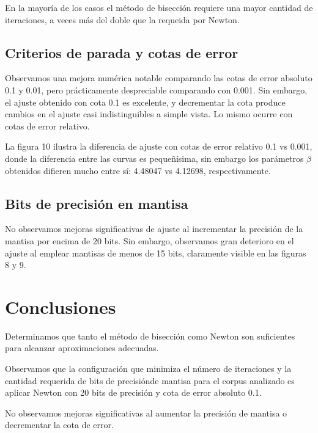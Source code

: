 \documentclass[a4paper,10pt,twoside]{article}
\begin{document}
En la mayoría de los casos el método de bisección requiere una mayor cantidad
de iteraciones, a veces más del doble que la requeida por Newton.


\subsection{Criterios de parada y cotas de error}
Observamos una mejora numérica notable comparando las cotas de error absoluto 0.1 y 0.01,
pero prácticamente despreciable comparando con 0.001. Sin embargo, el ajuste
obtenido con cota 0.1 es excelente, y decrementar la cota produce cambios en
el ajuste casi indistinguibles a simple vista. Lo mismo ocurre con cotas de error relativo.

La figura 10 ilustra la diferencia de ajuste con cotas de error relativo 0.1 vs 0.001,
donde la diferencia entre las curvas es pequeñísima, sin embargo los parámetros
$\beta$ obtenidos difieren mucho entre sí: 4.48047 vs 4.12698, respectivamente.


\subsection{Bits de precisión en mantisa}
No observamos mejoras significativas de ajuste al incrementar la precisión de
la mantisa por encima de 20 bits. Sin embargo, observamos gran deterioro en el
ajuste al emplear mantisas de menos de 15 bits, claramente visible en las figuras
8 y 9.




\section{Conclusiones}

Determinamos que tanto el método de bisección como Newton son suficientes para
alcanzar aproximaciones adecuadas.

Observamos que la configuración que minimiza el número de iteraciones y la
cantidad requerida de bits de precisiónde mantisa para el corpus analizado es
aplicar Newton con 20 bits de precisión y cota de error absoluto 0.1.

No observamos mejoras significativas al aumentar la precisión de mantisa o
decrementar la cota de error.
\end{document}
